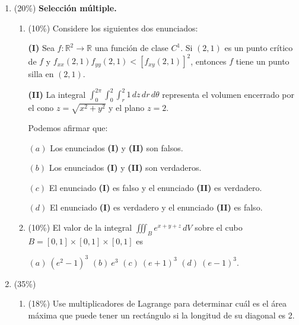 \documentclass[11pt]{article}
\begin{document}
\vspace{10pt}
\begin{enumerate}
\item{} (20\%) \textbf{Selección múltiple.}
\begin{enumerate}
\item{} (10\%) Considere los siguientes dos enunciados:

\vspace{4pt}
\noindent \textbf{(I)} Sea $f:\mathbb{R}^2\to\mathbb{R}$ una función de clase $C^1$. Si $(2,1)$ es un punto crítico de $f$ y $f_{xx}(2,1)f_{yy}(2,1)<[f_{xy}(2,1)]^2$, entonces $f$ tiene un punto silla en $(2,1)$.

\noindent \textbf{(II)} La integral $\displaystyle\int_0^{2\pi}\int_0^2\int_r^2 1\,dz\,dr\,d\theta$ representa el volumen encerrado por el cono $z=\sqrt{x^2+y^2}$ y el plano $z=2$.

\vspace{4pt}
\noindent Podemos afirmar que:

\vspace{4pt}
\noindent $(a)$ Los enunciados \textbf{(I)} y \textbf{(II)} son falsos.

\noindent $(b)$ Los enunciados \textbf{(I)} y \textbf{(II)} son verdaderos.

\noindent $(c)$ El enunciado \textbf{(I)} es falso y el enunciado \textbf{(II)} es verdadero.

\noindent $(d)$ El enunciado \textbf{(I)} es verdadero y el enunciado \textbf{(II)} es falso.

\item{} (10\%) El valor de la integral $\displaystyle\iiint_B e^{x+y+z}\,dV$ sobre el cubo $B=[0,1]\times[0,1]\times[0,1]$ es

\vspace{4pt}
\noindent $(a)\ (e^2-1)^3$ \hspace{1cm} $(b)\ e^3$ \hspace{1cm} $(c)\ (e+1)^3$ \hspace{1cm} $(d)\ (e-1)^3$.
\end{enumerate}

\item{} (35\%)
\begin{enumerate}
\item{} (18\%) Use multiplicadores de Lagrange para determinar cuál es el área máxima que puede tener un rectángulo si la longitud de su diagonal es 2.

\vspace{5cm}


\end{enumerate}
\end{enumerate}
\end{document}
